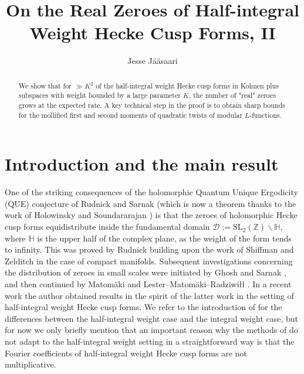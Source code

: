 \documentclass[a4paper,10pt,twoside]{amsart}
\theoremstyle{definition}
\numberwithin{equation}{section}
\renewcommand\:{\colon}
\begin{document}
\title{On the Real Zeroes of Half-integral Weight Hecke Cusp Forms, II}

\author{Jesse J\"a\"asaari}
\address{Department of Mathematics and Statistics\\
  University of Turku\\
  20014 Turku, Finland}
  
  
\begin{abstract}   
We show that for $\gg K^2$ of the half-integral weight Hecke cusp forms in Kohnen plus subspaces with weight bounded by a large parameter $K$, the number of "real" zeroes grows at the expected rate. A key technical step in the proof is to obtain sharp bounds for the mollified first and second moments of quadratic twists of modular $L$-functions. 
\end{abstract}
  
\maketitle

\section{Introduction and the main result}

\noindent One of the striking consequences of the holomorphic Quantum Unique Ergodicity (QUE) conjecture of Rudnick and Sarnak \cite{Rudnick-Sarnak1994, Luo-Sarnak2004} (which is now a theorem thanks to the work of Holowinsky and Soundararajan \cite{Holowinsky-Soundararajan2010}) is that the zeroes of holomorphic Hecke cusp forms equidistribute inside the fundamental domain $\mathcal D:=\mathrm{SL}_2(\mathbb Z)\backslash\mathbb H$, where $\mathbb H$ is the upper half of the complex plane, as the weight of the form tends to infinity. This was proved by Rudnick \cite{Rudnick2005} building upon the work of Shiffman and Zelditch \cite{Shiffman-Zelditch1999} in the case of compact manifolds. Subsequent investigations concerning the distribution of zeroes in small scales were initiated by Ghosh and Sarnak \cite{Ghosh-Sarnak2012}, and then continued by Matom\"aki \cite{Matomaki2016} and Lester--Matom\"aki--Radziwi{\l\l} \cite{Lester-Matomaki-Radziwill2018}. In a recent work \cite{Jaasaari2026} the author obtained results in the spirit of the latter work in the setting of half-integral weight Hecke cusp forms. We refer to the introduction of \cite{Jaasaari2026} for the differences between the half-integral weight case and the integral weight case, but for now we only briefly mention that an important reason why the methods of \cite{Ghosh-Sarnak2012, Matomaki2016, Lester-Matomaki-Radziwill2018} do not adapt to the half-integral weight setting in a straightforward way is that the Fourier coefficients of half-integral weight Hecke cusp forms are not multiplicative. 
\end{document}
